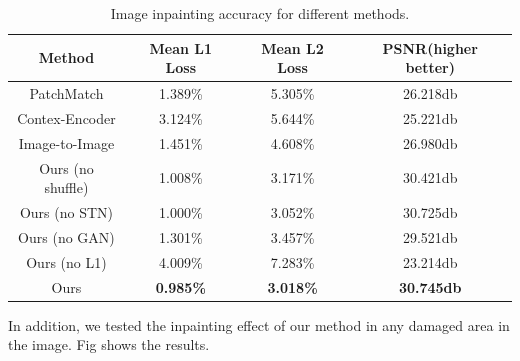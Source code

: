 \documentclass{IEEE_lsens}
\begin{document}
\begin{table}[htbp]
  \caption{Image inpainting accuracy for different methods.}
  \centering
  \begin{tabular}{c|c|c|c}
    \hline
    \bf{Method}             &   \bf{Mean L1 Loss}     &   \bf{Mean L2 Loss}   &   \bf{PSNR}(higher better)   \\
    \hline
    \hline
    PatchMatch       	 &  1.389\%         &  5.305\%          &  26.218db              \\
    \hline
    Contex-Encoder       &  3.124\%         &  5.644\%          &  25.221db              \\
    \hline
    Image-to-Image       &  1.451\%         &  4.608\%          &  26.980db              \\
    \hline
    Ours (no shuffle)    &  1.008\%         &  3.171\%          &  30.421db              \\
    \hline
    Ours (no STN)        &  1.000\%         &  3.052\%          &  30.725db              \\
    \hline
    Ours (no GAN)        &  1.301\%         &  3.457\%          &  29.521db             \\
    \hline
    Ours (no L1)         &  4.009\%         &  7.283\%          &  23.214db             \\
    \hline
    Ours                 & \bf{0.985\%}     &  \bf{3.018\%}     &  \bf{30.745db}              \\
    \hline
  \end{tabular}
  \label{resultTable}
\end{table}
In addition, we tested the inpainting effect of our method in any damaged area in the image. Fig shows the results.
\end{document}
